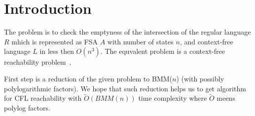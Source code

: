 \section{Introduction}

%
%
%

The problem is to check the emptyness of the intersection of the regular language $R$ mhich is represented as FSA $A$ with number of states $n$, and context-free language $L$ in less then $O(n^3)$. The equvalent problem is a context-free reachability problem~\cite{Reps:1997:PAV:271338.271343}.

First step is a reduction of the given problem to BMM($n$) (with possibly polylogarithmic factors).
We hope that such reduction helps us to get algorithm for CFL reachability with $\widetilde{O}(BMM(n))$ time complexity where $\widetilde{O}$ meens polylog factors.
